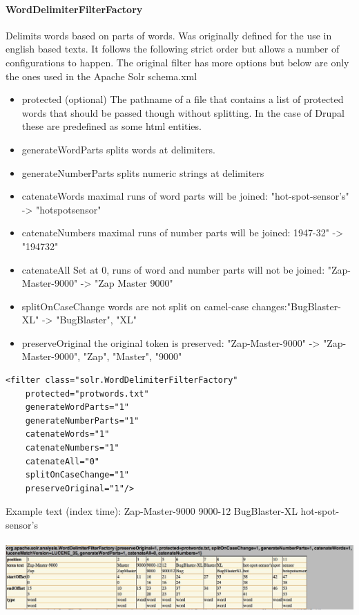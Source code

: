 \paragraph{WordDelimiterFilterFactory} Delimits words based on parts of words. Was originally defined for the use in english based texts. It follows the following strict order but allows a number of configurations to happen. The original filter has more options but below are only the ones used in the Apache Solr schema.xml
\begin{itemize}
\item{protected} (optional) The pathname of a file that contains a list of protected words that should be passed though without splitting. In the case of Drupal these are predefined as some html entities.
\item{generateWordParts} splits words at delimiters. 
\item{generateNumberParts}  splits numeric strings at delimiters
\item{catenateWords} maximal runs of word parts will be joined: "hot-spot-sensor's" -> "hotspotsensor"
\item{catenateNumbers} maximal runs of number parts will be joined: 1947-32" -> "194732"
\item{catenateAll} Set at 0, runs of word and number parts will not be joined: "Zap-Master-9000" -> "Zap Master 9000"
\item{splitOnCaseChange} words are not split on camel-case changes:"BugBlaster-XL" -> "BugBlaster", "XL"
\item{preserveOriginal} the original token is preserved: "Zap-Master-9000" -> "Zap-Master-9000", "Zap", "Master", "9000"
\end{itemize}
\begin{verbatim}
<filter class="solr.WordDelimiterFilterFactory"
    protected="protwords.txt"
    generateWordParts="1"
    generateNumberParts="1"
    catenateWords="1"
    catenateNumbers="1"
    catenateAll="0"
    splitOnCaseChange="1"
    preserveOriginal="1"/>
\end{verbatim}
Example text (index time): Zap-Master-9000 9000-12 BugBlaster-XL hot-spot-sensor's
\mbox{} \\
\mbox{} \\
\includegraphics[width=\textwidth]{images/worddelimiterfactory.jpg}

